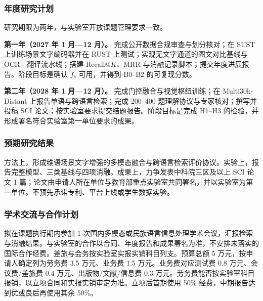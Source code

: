 \justifying
\NSFCBodyText

\subsubsection{年度研究计划}

研究期限为两年，与实验室开放课题管理要求一致。

\textbf{第一年（2027 年 1 月—12 月）。} 完成公开数据合规审查与划分核对；在 SUST 上训练场景文字编码器并在 RUST 上测试；实现无文字通道的图文对比基线与 OCR—翻译流水线；搭建 Recall@$K$、MRR 与消融记录脚本；提交年度进展报告。阶段目标是确认 $f_s$ 可用，并得到 B0--B2 的可复现分数。

\textbf{第二年（2028 年 1 月—12 月）。} 完成门控融合与视觉枢纽训练；在 Multi30k-Distant 上报告单语与跨语言检索；完成 200--400 题理解协议与专家核对；撰写并投稿 SCI 论文；按实验室要求提交结题报告。阶段目标是完成 H1--H3 的检验，并形成署名符合实验室第一单位要求的成果。

\subsubsection{预期研究结果}

方法上，形成维语场景文字增强的多模态融合与跨语言检索评价协议。实验上，报告完整模型、三类基线与四项消融。成果上，力争发表中科院三区及以上 SCI 论文 1 篇；论文由申请人所在单位与教育部重点实验室共同署名，并以实验室为第一单位。不预先承诺专利、平台上线或学生数据实验。

\subsubsection{学术交流与合作计划}

拟在课题执行期内参加 1 次国内多模态或民族语言信息处理学术会议，汇报检索与消融结果。与实验室的合作以合同、年度报告和成果署名为准，不安排未落实的国际合作经费。差旅与会务按实验室实报实销科目列支。预算总额 5 万元，按申请人确定列为劳务费 3.5 万元、业务费 1.5 万元。业务费对应测试费 0.8 万元、会议费/差旅费 0.4 万元、出版物/文献/信息费 0.3 万元。劳务费能否按实验室科目报销，以立项合同和实报实销审定为准。立项后首期使用 50\% 经费，中期报告达到优或良后再使用其余 50\%。
